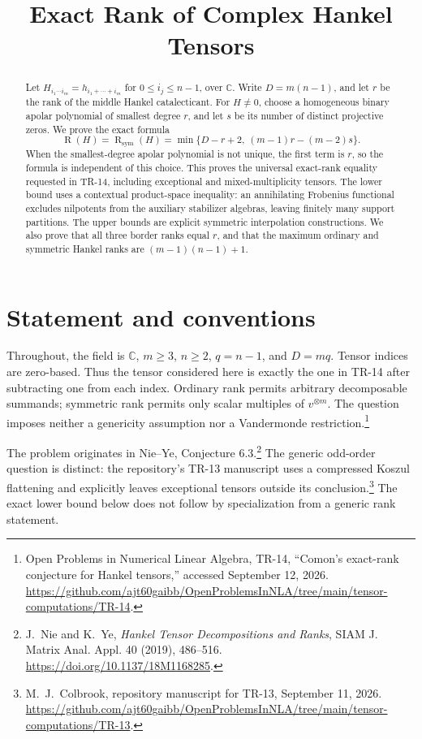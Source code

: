 \documentclass[11pt]{article}
\title{Exact Rank of Complex Hankel Tensors}
\author{}
\date{}
\theoremstyle{definition}
\theoremstyle{remark}
\newcommand{\C}{\mathbb C}
\newcommand{\Rk}{\operatorname{R}}
\newcommand{\SR}{\operatorname{R}_{\mathrm{sym}}}
\begin{document}
\maketitle
\vspace{-2.5em}
\begin{abstract}
Let $H_{i_1\cdots i_m}=h_{i_1+\cdots+i_m}$ for $0\le i_j\le n-1$, over $\C$.
Write $D=m(n-1)$, and let $r$ be the rank of the middle Hankel catalecticant.
For $H\ne0$, choose a homogeneous binary apolar polynomial of smallest degree $r$,
and let $s$ be its number of distinct projective zeros.
We prove the exact formula
\[
\Rk(H)=\SR(H)=\min\{D-r+2,\ (m-1)r-(m-2)s\}.
\]
When the smallest-degree apolar polynomial is not unique, the first term is $r$,
so the formula is independent of this choice. This proves the universal exact-rank
equality requested in TR-14, including exceptional and mixed-multiplicity tensors.
The lower bound uses a contextual product-space inequality: an annihilating
Frobenius functional excludes nilpotents from the auxiliary stabilizer algebras,
leaving finitely many support partitions. The upper bounds are explicit symmetric
interpolation constructions. We also prove that all three border ranks equal $r$,
and that the maximum ordinary and symmetric Hankel ranks are
$(m-1)(n-1)+1$.
\end{abstract}

\section{Statement and conventions}

Throughout, the field is $\C$, $m\ge3$, $n\ge2$, $q=n-1$, and $D=mq$.
Tensor indices are zero-based. Thus the tensor considered here is exactly the
one in TR-14 after subtracting one from each index. Ordinary rank permits
arbitrary decomposable summands; symmetric rank permits only scalar multiples
of $v^{\otimes m}$. The question imposes neither a genericity assumption nor a
Vandermonde restriction.\footnote{Open Problems in Numerical Linear Algebra,
TR-14, ``Comon's exact-rank conjecture for Hankel tensors,'' accessed September 12,
2026. \url{https://github.com/ajt60gaibb/OpenProblemsInNLA/tree/main/tensor-computations/TR-14}.}

The problem originates in Nie--Ye, Conjecture 6.3.\footnote{J.~Nie and K.~Ye,
\emph{Hankel Tensor Decompositions and Ranks}, SIAM J. Matrix Anal. Appl.
40 (2019), 486--516. \url{https://doi.org/10.1137/18M1168285}.}
The generic odd-order question is distinct: the repository's TR-13 manuscript
uses a compressed Koszul flattening and explicitly leaves exceptional tensors
outside its conclusion.\footnote{M.~J.~Colbrook, repository manuscript for TR-13,
September 11, 2026. \url{https://github.com/ajt60gaibb/OpenProblemsInNLA/tree/main/tensor-computations/TR-13}.}
The exact lower bound below does not follow by specialization from a generic
rank statement.
\end{document}

